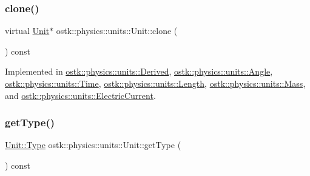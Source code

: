 \mbox{\label{classostk_1_1physics_1_1units_1_1_unit_ab203628f8a16b16c28d89eaa4c3aff67}} 
\subsubsection{\texorpdfstring{clone()}{clone()}}
{\footnotesize\ttfamily virtual \hyperlink{classostk_1_1physics_1_1units_1_1_unit}{Unit}$\ast$ ostk\+::physics\+::units\+::\+Unit\+::clone (\begin{DoxyParamCaption}{ }\end{DoxyParamCaption}) const\hspace{0.3cm}{\ttfamily [pure virtual]}}



Implemented in \hyperlink{classostk_1_1physics_1_1units_1_1_derived_a72a1ae09398204d52a9078da6d36d9d7}{ostk\+::physics\+::units\+::\+Derived}, \hyperlink{classostk_1_1physics_1_1units_1_1_angle_af0d5d649b2a1310e6337663f7b9283bf}{ostk\+::physics\+::units\+::\+Angle}, \hyperlink{classostk_1_1physics_1_1units_1_1_time_ae714d9f44d7ab651de5f37c5085f38fa}{ostk\+::physics\+::units\+::\+Time}, \hyperlink{classostk_1_1physics_1_1units_1_1_length_aeeb9cf27e0ea9bd818ad806cf3083658}{ostk\+::physics\+::units\+::\+Length}, \hyperlink{classostk_1_1physics_1_1units_1_1_mass_a1466c0c4860d94b0e6630476d4216033}{ostk\+::physics\+::units\+::\+Mass}, and \hyperlink{classostk_1_1physics_1_1units_1_1_electric_current_ac8a261411dee39c74bc43201e8e9c9dd}{ostk\+::physics\+::units\+::\+Electric\+Current}.

\mbox{\label{classostk_1_1physics_1_1units_1_1_unit_aab2a8bd39d0294623a8be4bee9865aa2}} 
\subsubsection{\texorpdfstring{get\+Type()}{getType()}}
{\footnotesize\ttfamily \hyperlink{classostk_1_1physics_1_1units_1_1_unit_a113924e2dd880bd0e95d4ee9646ea4ca}{Unit\+::\+Type} ostk\+::physics\+::units\+::\+Unit\+::get\+Type (\begin{DoxyParamCaption}{ }\end{DoxyParamCaption}) const}

